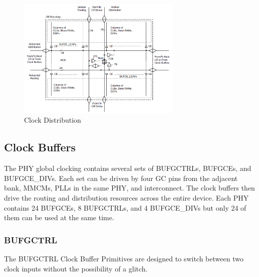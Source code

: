 \documentclass[12pt, a4paper]{report}
\begin{document}
    \begin{figure}[H]
        \begin{center}
            \includegraphics[width=0.7\textwidth]{images/clockDistr.png}
            \caption{Clock Distribution}
            \label{clockDistr}
        \end{center}
    \end{figure}


    \subsection{Clock Buffers}    
    The PHY global clocking contains several sets of BUFGCTRLs, BUFGCEs, and BUFGCE\_DIVs. Each set can be driven by four GC pins from the adjacent bank, MMCMs, PLLs in the same PHY, and interconnect. The clock buffers then drive the routing and distribution resources
    across the entire device. Each PHY contains 24 BUFGCEs, 8 BUFGCTRLs, and 4 BUFGCE\_DIVs  but only 24 of them can be used at the same time.

    \subsubsection{BUFGCTRL}
    The BUFGCTRL Clock Buffer Primitives are designed to switch between two clock inputs without the possibility of a glitch.     
\end{document}
